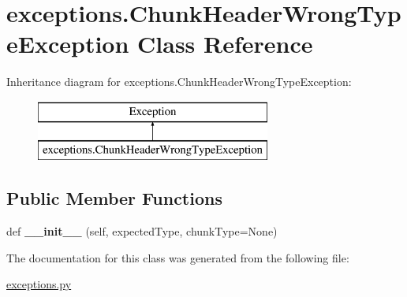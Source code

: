 \hypertarget{classexceptions_1_1ChunkHeaderWrongTypeException}{}\section{exceptions.\+Chunk\+Header\+Wrong\+Type\+Exception Class Reference}
\label{classexceptions_1_1ChunkHeaderWrongTypeException}
Inheritance diagram for exceptions.\+Chunk\+Header\+Wrong\+Type\+Exception\+:\begin{figure}[H]
\begin{center}
\leavevmode
\includegraphics[height=2.000000cm]{classexceptions_1_1ChunkHeaderWrongTypeException}
\end{center}
\end{figure}
\subsection*{Public Member Functions}
\begin{DoxyCompactItemize}
\item 
\mbox{\label{classexceptions_1_1ChunkHeaderWrongTypeException_a82517f741262b1a4d502d3e6414ae4d9}} 
def {\bfseries \+\_\+\+\_\+init\+\_\+\+\_\+} (self, expected\+Type, chunk\+Type=None)
\end{DoxyCompactItemize}


The documentation for this class was generated from the following file\+:\begin{DoxyCompactItemize}
\item 
\mbox{\hyperlink{exceptions_8py}{exceptions.\+py}}\end{DoxyCompactItemize}

